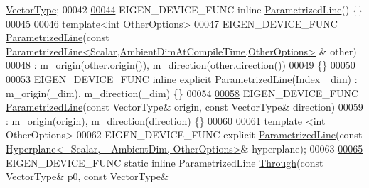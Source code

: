 \begin{DoxyCode}
      \hyperlink{group___core___module}{VectorType};
00042 
\hyperlink{group___geometry___module_a7c23f36d93cf3b3c2b37fd9f9eda5685}{00044}   EIGEN\_DEVICE\_FUNC \textcolor{keyword}{inline} \hyperlink{group___geometry___module_a7c23f36d93cf3b3c2b37fd9f9eda5685}{ParametrizedLine}() \{\}
00045   
00046   \textcolor{keyword}{template}<\textcolor{keywordtype}{int} OtherOptions>
00047   EIGEN\_DEVICE\_FUNC \hyperlink{group___geometry___module_a7c23f36d93cf3b3c2b37fd9f9eda5685}{ParametrizedLine}(\textcolor{keyword}{const} 
      \hyperlink{group___geometry___module_class_eigen_1_1_parametrized_line}{ParametrizedLine<Scalar,AmbientDimAtCompileTime,OtherOptions>}
      & other)
00048    : m\_origin(other.origin()), m\_direction(other.direction())
00049   \{\}
00050 
\hyperlink{group___geometry___module_ac4ba4fe484f3a3abf78edec8c60ea13a}{00053}   EIGEN\_DEVICE\_FUNC \textcolor{keyword}{inline} \textcolor{keyword}{explicit} \hyperlink{group___geometry___module_ac4ba4fe484f3a3abf78edec8c60ea13a}{ParametrizedLine}(Index \_dim) : m\_origin(\_dim), 
      m\_direction(\_dim) \{\}
00054 
\hyperlink{group___geometry___module_a1b1d3ff9dee6f252f14bc2d8f3f0bb02}{00058}   EIGEN\_DEVICE\_FUNC \hyperlink{group___geometry___module_a1b1d3ff9dee6f252f14bc2d8f3f0bb02}{ParametrizedLine}(\textcolor{keyword}{const} VectorType& origin, \textcolor{keyword}{const} VectorType& direction)
00059     : m\_origin(origin), m\_direction(direction) \{\}
00060 
00061   \textcolor{keyword}{template} <\textcolor{keywordtype}{int} OtherOptions>
00062   EIGEN\_DEVICE\_FUNC \textcolor{keyword}{explicit} \hyperlink{group___geometry___module_a7c23f36d93cf3b3c2b37fd9f9eda5685}{ParametrizedLine}(\textcolor{keyword}{const} 
      \hyperlink{group___geometry___module_class_eigen_1_1_hyperplane}{Hyperplane<\_Scalar, \_AmbientDim, OtherOptions>}& hyperplane);
00063 
\hyperlink{group___geometry___module_a79fec5983b16b02100d67c81407e96fa}{00065}   EIGEN\_DEVICE\_FUNC \textcolor{keyword}{static} \textcolor{keyword}{inline} ParametrizedLine \hyperlink{group___geometry___module_a79fec5983b16b02100d67c81407e96fa}{Through}(\textcolor{keyword}{const} VectorType& p0, \textcolor{keyword}{const} VectorType& 

\end{DoxyCode}
